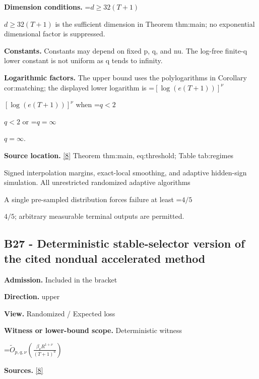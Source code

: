 \documentclass[10pt,a4paper]{article}
\newcommand{\AtlasMath}[1]{\par\begingroup\centering\setbox0=\hbox{$\displaystyle #1$}\ifdim\wd0>1.4\linewidth\typeout{ATLAS WIDE FORMULA: \the\wd0}\fi\ifdim\wd0>\linewidth\resizebox{\linewidth}{!}{\box0}\else\box0\fi\par\endgroup}
\newcommand{\AtlasInlineMath}[1]{\begingroup\setbox0=\hbox{$#1$}\ifdim\wd0>.4\linewidth\endgroup\AtlasMath{#1}\else\endgroup$#1$\fi}
\begin{document}
\textbf{Dimension conditions.} \AtlasInlineMath{d\ge32(T+1)} is the sufficient dimension in Theorem thm:main; no exponential dimensional factor is suppressed.



\textbf{Constants.} Constants may depend on fixed p, q, and nu. The log-free finite-q lower constant is not uniform as q tends to infinity.



\textbf{Logarithmic factors.} The upper bound uses the polylogarithms in Corollary cor:matching; the displayed lower logarithm is \AtlasInlineMath{[\log(e(T+1))]^\nu} when \AtlasInlineMath{q<2} or \AtlasInlineMath{q=\infty}.



\textbf{Source location.} \href{https://github.com/WU-Wendao/Colombo/blob/main/colombo_sensorium/Complexity_altas/data/sources/colombo/B1/manuscript.pdf}{[8]} Theorem thm:main, eq:threshold; Table tab:regimes



Signed interpolation margins, exact-local smoothing, and adaptive hidden-sign simulation. All unrestricted randomized adaptive algorithms



A single pre-sampled distribution forces failure at least \AtlasInlineMath{4/5}; arbitrary measurable terminal outputs are permitted.



\subsection{B27 - Deterministic stable-selector version of the cited nondual accelerated method}


\textbf{Admission.} Included in the bracket



\textbf{Direction.} upper



\textbf{View.} Randomized / Expected loss



\textbf{Witness or lower-bound scope.} Deterministic witness



\AtlasMath{\widetilde O_{p,q,\nu}\!\left(\frac{\beta_\nu R^{1+\nu}}{(T+1)^a}\right)}


\textbf{Sources.} \href{https://github.com/WU-Wendao/Colombo/blob/main/colombo_sensorium/Complexity_altas/data/sources/colombo/B1/manuscript.pdf}{[8]}
\end{document}
